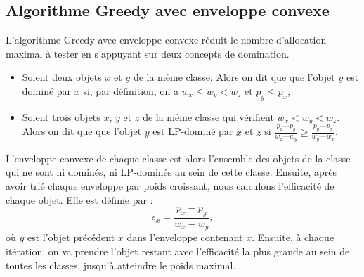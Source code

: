 \documentclass{article}
\begin{document}
\subsection{Algorithme Greedy avec enveloppe convexe}
L'algorithme Greedy avec enveloppe convexe réduit le nombre d'allocation maximal à tester en s'appuyant sur deux concepts de domination. 
\begin{itemize}
    \item Soient deux objets $x$ et $y$ de la même classe. Alors on dit que que l'objet $y$ est dominé par $x$ si, par définition, on a $w_{x} \leq w_{y} < w_{z}$ et $p_y \leq p_x$,
    \item Soient trois objets $x$, $y$ et $z$ de la même classe qui vérifient $w_{x} < w_{y} < w_{z}$. Alors on dit que que l'objet $y$ est LP-dominé par $x$ et $z$ si $\frac{p_z—p_y}{w_z—w_y} \geq \frac{p_y—p_x}{w_y—w_x}$.
\end{itemize}
L'enveloppe convexe de chaque classe est alors l'ensemble des objets de la classe qui ne sont ni dominés, ni LP-dominés au sein de cette classe. Ensuite, après avoir trié chaque enveloppe par poids croissant, nous calculons l'efficacité de chaque objet. Elle est définie par :
\begin{equation*}
    e_x = \frac{p_x - p_y}{w_x - w_y},
\end{equation*}
où $y$ est l'objet précédent $x$ dans l'enveloppe contenant $x$. Ensuite, à chaque itération, on va prendre l'objet restant avec l'efficacité la plus grande au sein de toutes les classes, jusqu'à atteindre le poids maximal.
\end{document}
